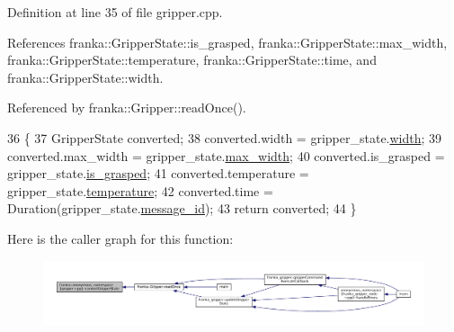 Definition at line 35 of file gripper.\+cpp.



References franka\+::\+Gripper\+State\+::is\+\_\+grasped, franka\+::\+Gripper\+State\+::max\+\_\+width, franka\+::\+Gripper\+State\+::temperature, franka\+::\+Gripper\+State\+::time, and franka\+::\+Gripper\+State\+::width.



Referenced by franka\+::\+Gripper\+::read\+Once().


\begin{DoxyCode}
36                                                                          \{
37   GripperState converted;
38   converted.width = gripper\_state.\hyperlink{structresearch__interface_1_1gripper_1_1GripperState_a7643e3d629b1add9c2ac13342f11da6d}{width};
39   converted.max\_width = gripper\_state.\hyperlink{structresearch__interface_1_1gripper_1_1GripperState_af4c06b1920fff49a7635c54460282483}{max\_width};
40   converted.is\_grasped = gripper\_state.\hyperlink{structresearch__interface_1_1gripper_1_1GripperState_a7c7120eff84cc9b460cf079dce6a2a7a}{is\_grasped};
41   converted.temperature = gripper\_state.\hyperlink{structresearch__interface_1_1gripper_1_1GripperState_ab96bb42ece0247d8c0111198f6fbe4d4}{temperature};
42   converted.time = Duration(gripper\_state.\hyperlink{structresearch__interface_1_1gripper_1_1GripperState_a02317c645fda5117638a1571c66591ae}{message\_id});
43   \textcolor{keywordflow}{return} converted;
44 \}
\end{DoxyCode}
Here is the caller graph for this function\+:
\nopagebreak
\begin{figure}[H]
\begin{center}
\leavevmode
\includegraphics[width=350pt]{namespacefranka_1_1anonymous__namespace_02gripper_8cpp_03_af656eaa1cbb4150840e47175fed828e8_icgraph}
\end{center}
\end{figure}
\mbox{\label{namespacefranka_1_1anonymous__namespace_02gripper_8cpp_03_a024993add0f6393c296d96275f33b2dc}} 
